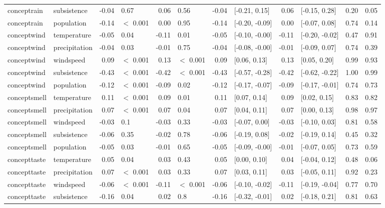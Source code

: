\begin{table}[ht]
\begin{tabular}{llrlrlrlrlrr}
  conceptrain & subsistence & -0.04 & 0.67 & 0.06 & 0.56 & -0.04 & [-0.21, 0.15] & 0.06 & [-0.15, 0.28] & 0.20 & 0.05 \\ 
  conceptrain & population & -0.14 & $<$ 0.001 & 0.00 & 0.95 & -0.14 & [-0.20, -0.09] & 0.00 & [-0.07, 0.08] & 0.74 & 0.14 \\ 
  conceptwind & temperature & -0.05 & 0.04 & -0.11 & 0.01 & -0.05 & [-0.10, -0.00] & -0.11 & [-0.20, -0.02] & 0.47 & 0.91 \\ 
  conceptwind & precipitation & -0.04 & 0.03 & -0.01 & 0.75 & -0.04 & [-0.08, -0.00] & -0.01 & [-0.09, 0.07] & 0.74 & 0.39 \\ 
  conceptwind & windspeed & 0.09 & $<$ 0.001 & 0.13 & $<$ 0.001 & 0.09 & [0.06, 0.13] & 0.13 & [0.05, 0.20] & 0.99 & 0.93 \\ 
  conceptwind & subsistence & -0.43 & $<$ 0.001 & -0.42 & $<$ 0.001 & -0.43 & [-0.57, -0.28] & -0.42 & [-0.62, -0.22] & 1.00 & 0.99 \\ 
  conceptwind & population & -0.12 & $<$ 0.001 & -0.09 & 0.02 & -0.12 & [-0.17, -0.07] & -0.09 & [-0.17, -0.01] & 0.74 & 0.73 \\ 
  conceptsmell & temperature & 0.11 & $<$ 0.001 & 0.09 & 0.01 & 0.11 & [0.07, 0.14] & 0.09 & [0.02, 0.15] & 0.83 & 0.82 \\ 
  conceptsmell & precipitation & 0.07 & $<$ 0.001 & 0.07 & 0.04 & 0.07 & [0.04, 0.11] & 0.07 & [0.00, 0.13] & 0.98 & 0.97 \\ 
  conceptsmell & windspeed & -0.03 & 0.1 & -0.03 & 0.33 & -0.03 & [-0.07, 0.00] & -0.03 & [-0.10, 0.03] & 0.81 & 0.58 \\ 
  conceptsmell & subsistence & -0.06 & 0.35 & -0.02 & 0.78 & -0.06 & [-0.19, 0.08] & -0.02 & [-0.19, 0.14] & 0.45 & 0.32 \\ 
  conceptsmell & population & -0.05 & 0.03 & -0.01 & 0.65 & -0.05 & [-0.09, -0.00] & -0.01 & [-0.07, 0.05] & 0.73 & 0.59 \\ 
  concepttaste & temperature & 0.05 & 0.04 & 0.03 & 0.43 & 0.05 & [0.00, 0.10] & 0.04 & [-0.04, 0.12] & 0.48 & 0.06 \\ 
  concepttaste & precipitation & 0.07 & $<$ 0.001 & 0.03 & 0.33 & 0.07 & [0.03, 0.11] & 0.03 & [-0.05, 0.11] & 0.92 & 0.23 \\ 
  concepttaste & windspeed & -0.06 & $<$ 0.001 & -0.11 & $<$ 0.001 & -0.06 & [-0.10, -0.02] & -0.11 & [-0.19, -0.04] & 0.77 & 0.70 \\ 
  concepttaste & subsistence & -0.16 & 0.04 & 0.02 & 0.8 & -0.16 & [-0.32, -0.01] & 0.02 & [-0.18, 0.21] & 0.81 & 0.63 \\ 

\end{tabular}
\end{table}
